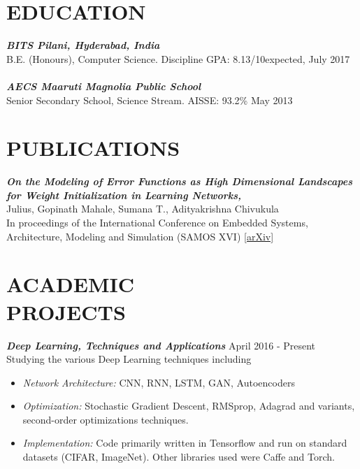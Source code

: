 \documentclass[margin, 10pt]{res} %
\begin{document}
\begin{resume}


\section{EDUCATION}

{\sl \textbf{BITS Pilani, Hyderabad, India}}  \\
B.E. (Honours), Computer Science. Discipline GPA: 8.13/10\hfill expected, July 2017 \\ \\
{\sl \textbf{AECS Maaruti Magnolia Public School}}  \\
Senior Secondary School, Science Stream. AISSE: 93.2\% \hfill May 2013 \\ 
 

\section{PUBLICATIONS} 
{\sl \textbf{On the Modeling of Error Functions as High Dimensional Landscapes for Weight Initialization in Learning Networks,}} \\ Julius, Gopinath Mahale, Sumana T., Adityakrishna Chivukula\\In proceedings of the International Conference on Embedded Systems, Architecture, Modeling and Simulation (SAMOS XVI) \href{https://arxiv.org/abs/1607.06011}{[arXiv]}
 
 
\section{ACADEMIC \\ PROJECTS}

{\sl \textbf{Deep Learning, Techniques and Applications}} \hfill April 2016 - Present\\
Studying the various Deep Learning techniques including
\begin{itemize} \itemsep -2pt %
\item \textit{Network Architecture: } CNN, RNN, LSTM, GAN, Autoencoders
\item \textit{Optimization: } Stochastic Gradient Descent, RMSprop, Adagrad and variants, second-order optimizations techniques.
\item \textit{Implementation: } Code primarily written in Tensorflow and run on standard datasets (CIFAR, ImageNet). Other libraries used were Caffe and Torch.
\end{itemize}
 

\end{resume}
\end{document}

